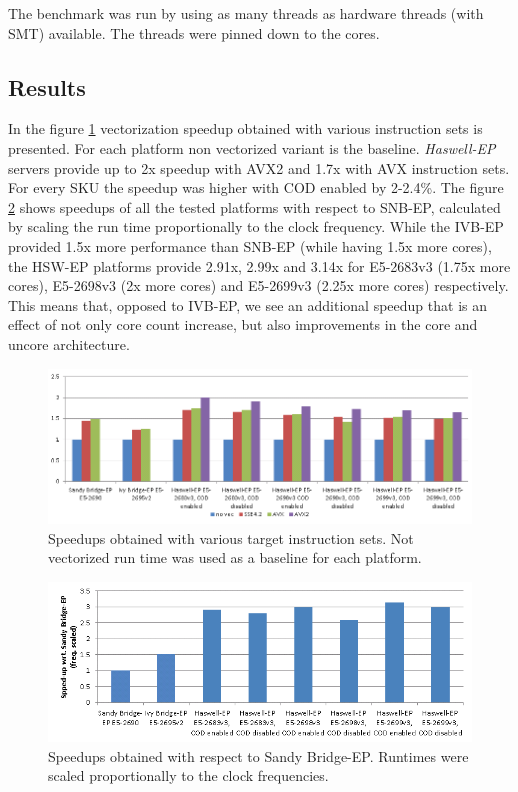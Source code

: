 \documentclass[a4paper]{jpconf}
\begin{document}
The benchmark was run by using as many threads as hardware threads (with SMT) available. The threads were pinned down to the cores.

\subsection{Results}
In the figure \ref{fig:vifit_vector} vectorization speedup obtained with various instruction sets is presented. For each platform non vectorized variant is the baseline. \textit{Haswell-EP} servers provide up to 2x speedup with AVX2 and 1.7x with AVX instruction sets. For every SKU the speedup was higher with COD enabled by 2-2.4\%.
The figure \ref{fig:vifit_speedup} shows speedups of all the tested platforms with respect to SNB-EP, calculated by scaling the run time proportionally to the clock frequency. While the IVB-EP provided 1.5x more performance than SNB-EP (while having 1.5x more cores), the HSW-EP platforms provide 2.91x, 2.99x and 3.14x for E5-2683v3 (1.75x more cores), E5-2698v3 (2x more cores) and E5-2699v3 (2.25x more cores) respectively. This means that, opposed to IVB-EP, we see an additional speedup that is an effect of not only core count increase, but also improvements in the core and uncore architecture.
\begin{figure}[ht!]
\centering
  \includegraphics[width=\textwidth]{vifit_vector}
  \caption{Speedups obtained with various target instruction sets. Not vectorized run time was used as a baseline for each platform.}
  \label{fig:vifit_vector}
\end{figure}
\begin{figure}[ht!]
\centering
  \includegraphics[width=\textwidth]{vifit_speedup}
  \caption{Speedups obtained with respect to Sandy Bridge-EP. Runtimes were scaled proportionally to the clock frequencies.}
  \label{fig:vifit_speedup}
\end{figure}
\end{document}
